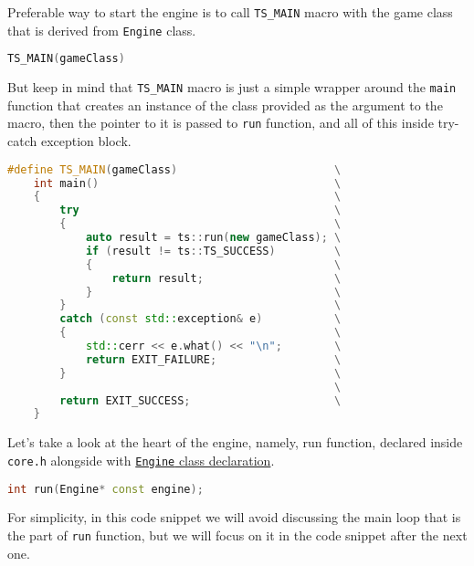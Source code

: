 Preferable way to start the engine is to call \texttt{TS\_MAIN} macro with the game class that is derived from \texttt{Engine} class. 
\begin{lstlisting}[language=c++, caption=Start of the example game (./game/game.cpp)]
TS_MAIN(gameClass)
\end{lstlisting}
But keep in mind that \texttt{TS\_MAIN} macro is just a simple wrapper around the \texttt{main} function that creates an instance of the class provided as the argument to the macro, then the pointer to it is passed to \texttt{run} function, and all of this inside try-catch exception block.
\begin{lstlisting}[language=c++, caption=\texttt{TS\_MAIN} definition (./engine/include/tsengine/core.h)]
#define TS_MAIN(gameClass)                        \
    int main()                                    \
    {                                             \
        try                                       \
        {                                         \
            auto result = ts::run(new gameClass); \
            if (result != ts::TS_SUCCESS)         \
            {                                     \
                return result;                    \
            }                                     \
        }                                         \
        catch (const std::exception& e)           \
        {                                         \
            std::cerr << e.what() << "\n";        \
            return EXIT_FAILURE;                  \
        }                                         \
                                                  \
        return EXIT_SUCCESS;                      \
    }
\end{lstlisting}

\label{sec:run_fun}
Let's take a look at the heart of the engine, namely, run function, declared inside \texttt{core.h} alongside with \hyperref[sec:engine_class]{\texttt{Engine} class declaration}.
\begin{lstlisting}[language=c++, caption=Run function (./engine/include/tsengine/core.h)]
int run(Engine* const engine);
\end{lstlisting}

For simplicity, in this code snippet we will avoid discussing the main loop that is the part of \texttt{run} function, but we will focus on it in the code snippet after the next one.

